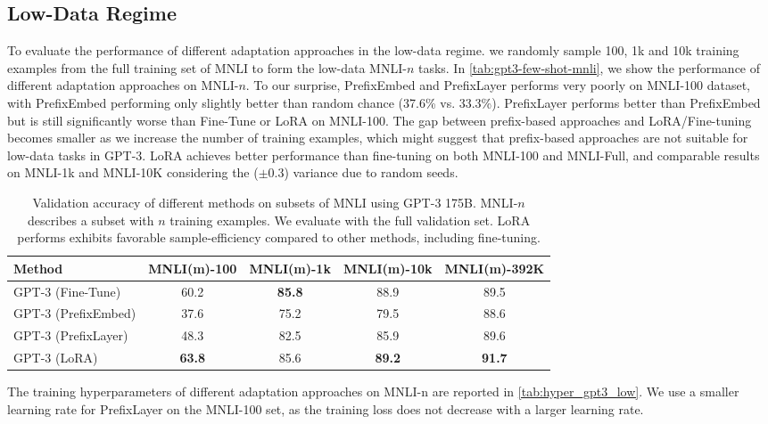 \documentclass{article} %
\begin{document}
\subsection{Low-Data Regime}
\label{app:low_data}
To evaluate the performance of different adaptation approaches in the low-data regime. we randomly sample 100, 1k and 10k training examples from the full training set of MNLI to form the low-data MNLI-$n$ tasks.
In \autoref{tab:gpt3-few-shot-mnli}, we show the performance of different adaptation approaches on MNLI-$n$. 
To our surprise, PrefixEmbed and PrefixLayer performs very poorly on MNLI-100 dataset, with PrefixEmbed performing only slightly better than random chance (37.6\% vs. 33.3\%).
PrefixLayer performs better than PrefixEmbed but is still significantly worse than Fine-Tune or LoRA on MNLI-100.
The gap between prefix-based approaches and LoRA/Fine-tuning becomes smaller as we increase the number of training examples, which might suggest that prefix-based approaches are not suitable for low-data tasks in GPT-3.
LoRA achieves better performance than fine-tuning on both MNLI-100 and MNLI-Full, and comparable results on MNLI-1k and MNLI-10K considering the ($\pm0.3$) variance due to random seeds. 
\begin{table}[h]
\centering
\begin{tabular}{l|cccc}
\hline
\toprule
Method & MNLI(m)-100 &  MNLI(m)-1k &  MNLI(m)-10k &  MNLI(m)-392K \\
\midrule
GPT-3 (Fine-Tune)  & 60.2  & \textbf{85.8} & 88.9 & 89.5 \\
GPT-3 (PrefixEmbed) & 37.6  & 75.2  & 79.5 & 88.6 \\
GPT-3 (PrefixLayer) & 48.3  & 82.5  & 85.9 & 89.6 \\
GPT-3 (LoRA)         & \textbf{63.8}   & 85.6  & \textbf{89.2} & \textbf{91.7} \\
\bottomrule
\end{tabular}
\caption{Validation accuracy of different methods on subsets of MNLI using GPT-3 175B. MNLI-$n$ describes a subset with $n$ training examples. We evaluate with the full validation set. LoRA performs exhibits favorable sample-efficiency compared to other methods, including fine-tuning.}
\label{tab:gpt3-few-shot-mnli}
\end{table}

The training hyperparameters of different adaptation approaches on MNLI-{n} are reported in \autoref{tab:hyper_gpt3_low}.
We use a smaller learning rate for PrefixLayer on the MNLI-100 set, as the training loss does not decrease with a larger learning rate.
\end{document}
